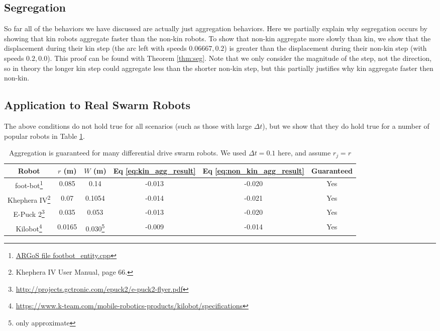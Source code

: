 \documentclass[conference]{IEEEtran}
\begin{document}
  \subsection{Segregation}

    So far all of the behaviors we have discussed are actually just aggregation behaviors. Here we partially explain why segregation occurs by showing that kin robots aggregate faster than the non-kin robots. To show that non-kin aggregate more slowly than kin, we show that the displacement during their kin step (the arc left with speeds $0.06667, 0.2$) is greater than the displacement during their non-kin step (with speeds $0.2, 0.0$). This proof can be found with Theorem \ref{thm:seg}. Note that we only consider the magnitude of the step, not the direction, so in theory the longer kin step could aggregate less than the shorter non-kin step, but this partially justifies why kin aggregate faster then non-kin.

  \subsection{Application to Real Swarm Robots}

    The above conditions do not hold true for all scenarios (such as those with large $\Delta t$), but we show that they do hold true for a number of popular robots in Table \ref{table:robots}.

    \begin{savenotes}
    \begin{table}
      \centering
      \caption{Aggregation is guaranteed for many differential drive swarm robots. We used $\Delta t=0.1$ here, and assume $r_j=r$}
      \begin{tabular}{|c|c|c|c|c|c|} \hline
        Robot & $r$ (m) & $W$ (m) & Eq \eqref{eq:kin_agg_result}& Eq \eqref{eq:non_kin_agg_result} & Guaranteed \\ \hline
        foot-bot\footnote{\href{https://github.com/ilpincy/argos3/blob/master/src/plugins/robots/foot-bot/simulator/footbot_entity.cpp}{ARGoS file footbot\_entity.cpp}} &
            0.085 & 0.14 & -0.013 & -0.020 & Yes \\ \hline
        Khephera IV\footnote{Khephera IV User Manual, page 66.} &
            0.07 & 0.1054 & -0.014 & -0.021 & Yes \\ \hline
        E-Puck 2\footnote{\href{http://projects.gctronic.com/epuck2/e-puck2-flyer.pdf}{http://projects.gctronic.com/epuck2/e-puck2-flyer.pdf}} &
            0.035 & 0.053 & -0.013 & -0.020 & Yes \\ \hline
        Kilobot\footnote{\href{https://www.k-team.com/mobile-robotics-products/kilobot/specifications}{https://www.k-team.com/mobile-robotics-products/kilobot/specifications}} &
            0.0165 & 0.030\footnote{only approximate} & -0.009 & -0.014 & Yes \\ \hline
      \end{tabular}
      \label{table:robots}
    \end{table}
    \end{savenotes}
\end{document}
